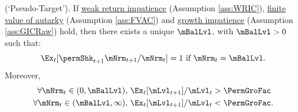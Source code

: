   \begin{theorem}(`Pseudo-Target').
If \hyperlink{WRIC}{weak return impatience} (Assumption \ref{ass:WRIC}), \hyperlink{FVAC}{finite value of autarky} (Assumption \ref{ass:FVAC}) and \hyperlink{GICRaw}{growth impatience} (Assumption \ref{ass:GICRaw}) hold, then there exists a unique $\mBalLvl$, with $\mBalLvl>0$ such that:
    \begin{equation}
      \Ex_t [\permShk_{t+1}{\mNrm}_{t+1}/\mNrm_t] = 1 \mbox{~if~} \mNrm_t = \mBalLvl.
      \label{eq:mBalLvl}
    \end{equation}
    Moreover,
    \begin{equation}
      \label{eq:stabilityStE}
      \begin{aligned}
        \forall {\mNrm}_t\in(0,\mBalLvl),      \,\,& \Ex_{t}[\mLvl_{t+1}]/\mLvl_{t} > \PermGroFac \\
        \forall {\mNrm}_t\in(\mBalLvl,\infty), \,\,& \Ex_{t}[\mLvl_{t+1}]/\mLvl_{t} < \PermGroFac.
      \end{aligned}
    \end{equation}
  \end{theorem}
